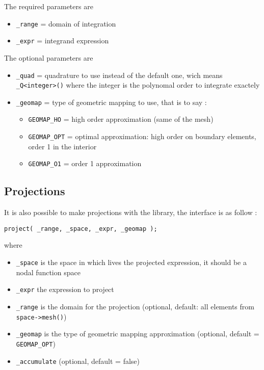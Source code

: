 \noindent The required parameters are
\begin{itemize}
 \item \lstinline!_range!  = domain of integration
 \item \lstinline!_expr!  = integrand expression
\end{itemize}
The optional parameters are
\begin{itemize}
 \item \lstinline!_quad!  = quadrature to use instead of the default one, wich means \lstinline!_Q<integer>()! where the integer is the polynomal order to integrate exactely
 \item \lstinline!_geomap!  = type of geometric mapping to use, that is to say :
	\begin{itemize}
  	\item \lstinline!GEOMAP_HO!  =  high order approximation (same of the mesh)
  	\item \lstinline!GEOMAP_OPT!  = optimal approximation: high order on boundary elements, order 1 in the interior
  	\item \lstinline!GEOMAP_O1!  = order 1 approximation
	\end{itemize}
\end{itemize}


\subsection{Projections}
\label{keywords:projections}
It is also possible to make projections with the library, the interface is as follow :
\begin{lstlisting}
project( _range, _space, _expr, _geomap );
\end{lstlisting}
where
\begin{itemize}
 \item \lstinline!_space!  is the space in which lives the projected expression, it should be a nodal function space
  \item \lstinline!_expr!  the expression to project
  \item \lstinline!_range!  is the domain for the projection (optional, default: all elements from \lstinline!space->mesh()!) 
  \item \lstinline!_geomap!  is the type of geometric mapping approximation (optional, default = \lstinline!GEOMAP_OPT!)
  \item \lstinline!_accumulate!  (optional, default = false)
\end{itemize}

